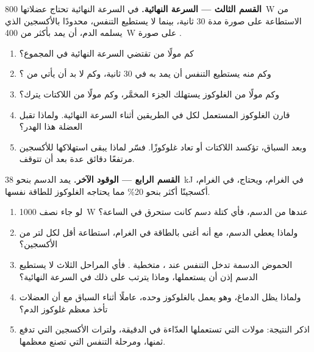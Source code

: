 \begin{problem}
\medskip
\noindent\textbf{القسم الثالث --- السرعة النهائية.}
في السرعة النهائية تحتاج عضلاتها \qty{800}{W} من الاستطاعة على صورة
 مدة 30 ثانية، بينما لا يستطيع التنفس، محدودًا بالأكسجين الذي يسلمه
الدم، أن يمد بأكثر من \qty{400}{W} على صورة .
\begin{enumerate}[resume]
  \item كم مولًا من  تقتضي السرعة النهائية في المجموع؟
  \item وكم منه يستطيع التنفس أن يمد به في 30 ثانية، وكم لا بد أن يأتي
        من ؟
  \item وكم مولًا من الغلوكوز يستهلك الجزء المخمَّر، وكم مولًا من
        اللاكتات يترك؟
  \item قارن الغلوكوز المستعمل لكل  في الطريقين أثناء السرعة
        النهائية. ولماذا تقبل العضلة هذا الهدر؟
  \item وبعد السباق، تؤكسد اللاكتات أو تعاد غلوكوزًا. فسّر لماذا يبقى
        استهلاكها للأكسجين مرتفعًا دقائق عدة بعد أن تتوقف.
\end{enumerate}

\medskip
\noindent\textbf{القسم الرابع --- الوقود الآخر.}
يمد الدسم بنحو \qty{38}{kJ} في الغرام، ويحتاج، في الغرام، أكسجينًا
أكثر بنحو 20\% مما يحتاجه الغلوكوز للطاقة نفسها.
\begin{enumerate}[resume]
  \item لو جاء نصف \qty{1000}{W} عندها من الدسم، فأي كتلة دسم كانت
        ستحرق في الساعة؟
  \item ولماذا يعطي الدسم، مع أنه أغنى بالطاقة في الغرام، استطاعة أقل
        لكل لتر من الأكسجين؟
  \item الحموض الدسمة تدخل التنفس عند ، متخطية .
        فأي المراحل الثلاث لا يستطيع الدسم إذن أن يستعملها، وماذا
        يترتب على ذلك في السرعة النهائية؟
  \item ولماذا يظل الدماغ، وهو يعمل بالغلوكوز وحده، عاملًا أثناء
        السباق مع أن العضلات تأخذ معظم غلوكوز الدم؟
  \item اذكر النتيجة: مولات  التي تستعملها العدّاءة في الدقيقة،
        ولترات الأكسجين التي تدفع ثمنها، ومرحلة التنفس التي تصنع
        معظمها.
\end{enumerate}
\end{problem}
